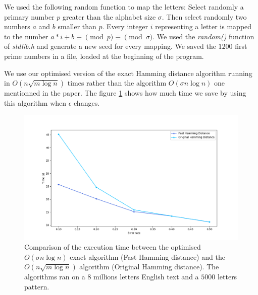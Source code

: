 \documentclass[preprint,12pt]{elsarticle}
\begin{document}
We used the following random function to map the letters:
Select randomly a primary number $p$ greater than the alphabet size $\sigma$.
Then select randomly two numbers $a$ and $b$ smaller than $p$.
Every integer $i$ representing a letter is mapped to the number
$a * i + b \equiv \pmod p \equiv \pmod \sigma$.
We used the \textit{random()} function of \textit{stdlib.h}
and generate a new seed for every mapping.
We saved the $1200$ first prime numbers in a file, loaded at the beginning of the program.


We use our optimised version of the exact Hamming distance algorithm
running in $O(n \sqrt{m \log n})$ times
rather than the algorithm $O(\sigma n \log n)$ one mentionned in the paper.
The figure \ref{AppHDComp} shows how much time we save by using this algorithm
when $\epsilon$ changes.




\begin{figure}[h]
\includegraphics[scale=0.45]{./figures/appHDCompareNaive.png}
\caption{Comparison of the execution time between the optimised $O(\sigma n \log n)$ exact algorithm
(Fast Hamming distance)
and the $O(n \sqrt{m \log n})$ algorithm (Original Hamming distance).
The algorithms ran on a $8$ millions letters English text and a $5000$ letters pattern.
}
\label{AppHDComp}
\end{figure}
\end{document}
